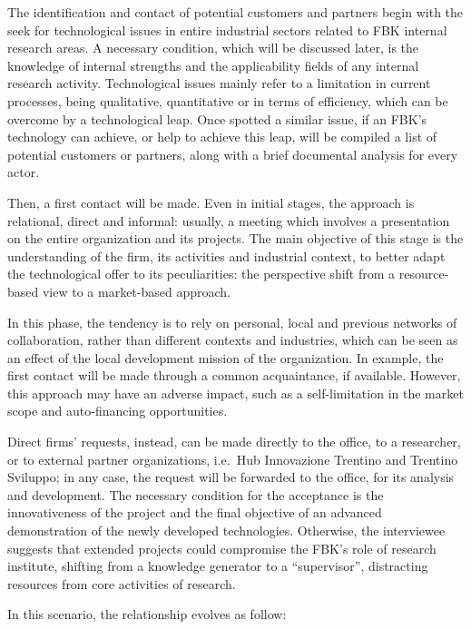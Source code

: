 The identification and contact of potential customers and partners begin with the seek for technological issues in entire industrial sectors related to FBK internal research areas. A necessary condition, which will be discussed later, is the knowledge of internal strengths and the applicability fields of any internal research activity. Technological issues mainly refer to a limitation in current processes, being qualitative, quantitative or in terms of efficiency, which can be overcome by a technological leap. Once spotted a similar issue, if an FBK's technology can achieve, or help to achieve this leap, will be compiled a list of potential customers or partners, along with a brief documental analysis for every actor. 

Then, a first contact will be made. Even in initial stages, the approach is relational, direct and informal: usually, a meeting which involves a presentation on the entire organization and its projects. The main objective of this stage is the understanding of the firm, its activities and industrial context, to better adapt the technological offer to its peculiarities: the perspective shift from a resource-based view to a market-based approach.
 
In this phase, the tendency is to rely on personal, local and previous networks of collaboration, rather than different contexts and industries, which can be seen as an effect of the local development mission of the organization. In example, the first contact will be made through a common acquaintance, if available. However, this approach may have an adverse impact, such as a self-limitation in the market scope and auto-financing opportunities.

Direct firms’ requests, instead, can be made directly to the office, to a researcher, or to external partner organizations, i.e.\ Hub Innovazione Trentino and Trentino Sviluppo; in any case, the request will be forwarded to the office, for its analysis and development. The necessary condition for the acceptance is the innovativeness of the project and the final objective of an advanced demonstration of the newly developed technologies. Otherwise, the interviewee suggests that extended projects could compromise the FBK's role of research institute, shifting from a knowledge generator to a \enquote{supervisor}, distracting resources from core activities of research.

In this scenario, the relationship evolves as follow:

